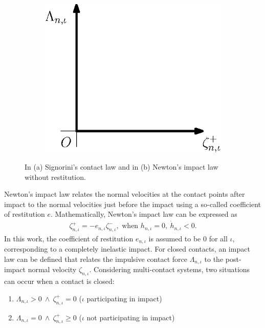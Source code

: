 \documentclass[../DC2017114Bouma.tex]{subfiles}
\begin{document}
\begin{figure}[h]
\begin{subfigure}{0.3\textwidth}
\includegraphics[width=\linewidth]{newtonimpact.eps}
\caption{}\label{fig:newtonimpact}
\end{subfigure}
\caption{In \textnormal{(a)} Signorini's contact law and in \textnormal{(b)} Newton's impact law without restitution.}
\end{figure}
Newton's impact law relates the normal velocities at the contact points after impact to the normal velocities just before the impact using a so-called coefficient of restitution $e$. Mathematically, Newton's impact law can be expressed as
\begin{align}
\zeta^+_{n,\iota} = -e_{n,\iota}\zeta^-_{n,\iota},\text{ when }h_{n,\iota}=0,\ \dot{h}_{n,\iota}<0.
\end{align}
%
%
In this work, the coefficient of restitution $e_{n,\iota}$ is assumed to be $0$ for all $\iota$, corresponding to a completely inelastic impact. For closed contacts, an impact law can be defined that relates the impulsive contact force $\Lambda_{n,\iota}$ to the post-impact normal velocity $\zeta_{n,\iota}$. Considering multi-contact systems, two situations can occur when a contact is closed:
\begin{enumerate}
\item $\Lambda_{n,\iota} > 0\ \wedge\ \zeta^+_{n,\iota} = 0$ ($\iota$ participating in impact)
\item $\Lambda_{n,\iota} = 0\ \wedge\ \zeta^+_{n,\iota} \geq 0$ ($\iota$ not participating in impact)
\end{enumerate}
\end{document}
